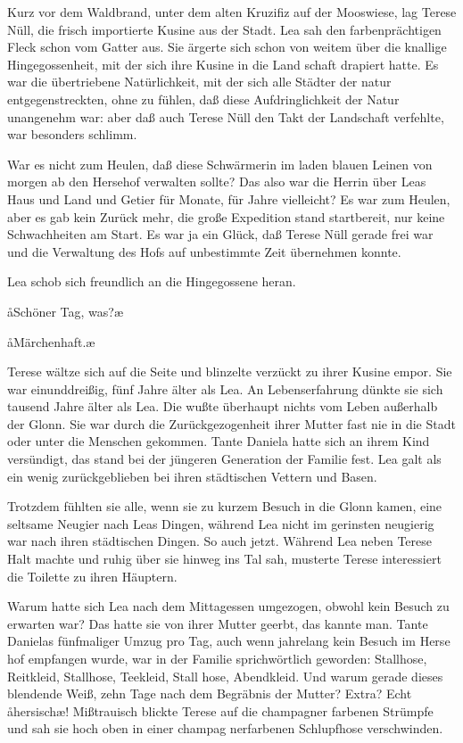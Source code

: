 Kurz vor dem Waldbrand, unter dem alten Kruzifiz auf der
Mooswiese, lag Terese Nüll, die frisch importierte Kusine
aus der Stadt. Lea sah den farbenprächtigen Fleck schon vom
Gatter aus. Sie ärgerte sich schon von weitem über die
knallige Hingegossenheit, mit der sich ihre Kusine in die Land\-%
schaft drapiert hatte. Es war die übertriebene Natürlichkeit,
mit der sich alle Städter der natur entgegenstreckten, ohne zu
fühlen, daß diese Aufdringlichkeit der Natur unangenehm
war: aber daß auch Terese Nüll den Takt der Landschaft
verfehlte, war besonders schlimm.

War es nicht zum Heulen, daß diese Schwärmerin im laden\-%
blauen Leinen von morgen ab den Hersehof verwalten sollte?
Das also war die Herrin über Leas Haus und Land und
Getier für Monate, für Jahre vielleicht? Es war zum Heulen,
aber es gab kein Zurück mehr, die große Expedition stand
startbereit, nur keine Schwachheiten am Start. Es war ja
ein Glück, daß Terese Nüll gerade frei war und die Verwaltung
des Hofs auf unbestimmte Zeit übernehmen konnte.

Lea schob sich freundlich an die Hingegossene heran.

\aa Schöner Tag, was?\ae

\aa Märchenhaft.\ae

Terese wältze sich auf die Seite und blinzelte verzückt zu ihrer
Kusine empor. Sie war einunddreißig, fünf Jahre älter als
Lea. An Lebenserfahrung dünkte sie sich tausend Jahre älter
als Lea. Die wußte überhaupt nichts vom Leben außerhalb
der Glonn. Sie war durch die Zurückgezogenheit ihrer Mutter
fast nie in die Stadt oder unter die Menschen gekommen. Tante
Daniela hatte sich an ihrem Kind versündigt, das stand bei
der jüngeren Generation der Familie fest. Lea galt als ein
wenig zurückgeblieben bei ihren städtischen Vettern und Basen.

Trotzdem fühlten sie alle, wenn sie zu kurzem Besuch in die
Glonn kamen, eine seltsame Neugier nach Leas Dingen,
während Lea nicht im gerinsten neugierig war nach ihren
städtischen Dingen. So auch jetzt. Während Lea neben Terese
Halt machte und ruhig über sie hinweg ins Tal sah, musterte
Terese interessiert die Toilette zu ihren Häuptern.

Warum hatte sich Lea nach dem Mittagessen umgezogen,
obwohl kein Besuch zu erwarten war? Das hatte sie von ihrer
Mutter geerbt, das kannte man. Tante Danielas fünfmaliger
Umzug pro Tag, auch wenn jahrelang kein Besuch im Herse\-%
hof empfangen wurde, war in der Familie sprichwörtlich
geworden: Stallhose, Reitkleid, Stallhose, Teekleid, Stall\-%
hose, Abendkleid. Und warum gerade dieses blendende Weiß,
zehn Tage nach dem Begräbnis der Mutter? Extra? Echt
\aa hersisch\ae! Mißtrauisch blickte Terese auf die champagner\-%
farbenen Strümpfe und sah sie hoch oben in einer champag\-%
nerfarbenen Schlupfhose verschwinden.

